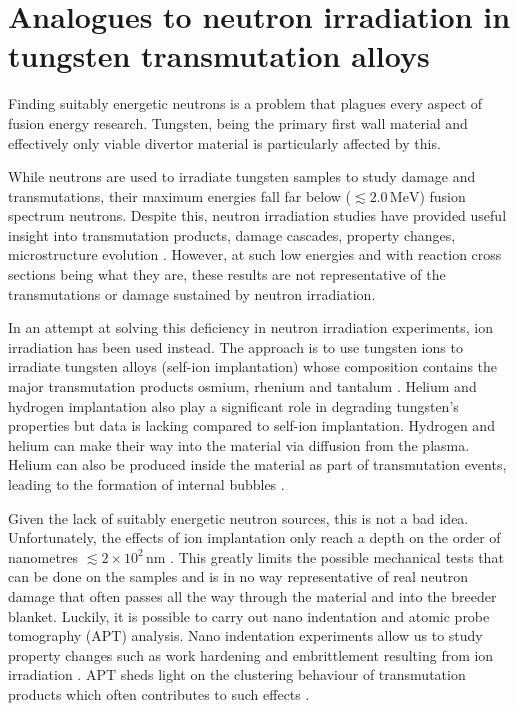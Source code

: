 \documentclass[12pt, a4paper]{article}
\begin{document}
	\section{Analogues to neutron irradiation in tungsten transmutation alloys}\label{s:ni}
		Finding suitably energetic neutrons is a problem that plagues every aspect of fusion energy research. Tungsten, being the primary first wall material and effectively only viable divertor material \cite{wdivwall} is particularly affected by this. 
		
		While neutrons are used to irradiate tungsten samples to study damage and transmutations, their maximum energies fall far below ($\lesssim 2.0\,\textrm{MeV}$) fusion spectrum neutrons. Despite this, neutron irradiation studies have provided useful insight into transmutation products, damage cascades, property changes, microstructure evolution \cite{transmute, nirrhard, colcas, nirrprop, nirpropmic, nirrmic}. However, at such low energies and with reaction cross sections being what they are, these results are not representative of the transmutations or damage sustained by neutron irradiation.
		
		In an attempt at solving this deficiency in neutron irradiation experiments, ion irradiation has been used instead. The approach is to use tungsten ions to irradiate tungsten alloys (self-ion implantation) whose composition contains the major transmutation products osmium, rhenium and tantalum \cite{ionirrmic, ionirrprop, ionirrprop2, hardening}. Helium and hydrogen implantation also play a significant role in degrading tungsten's properties \cite{helium} but data is lacking compared to self-ion implantation. Hydrogen and helium can make their way into the material via diffusion from the plasma. Helium can also be produced inside the material as part of transmutation events, leading to the formation of internal bubbles \cite{transmute, transmute2}.
		
		Given the lack of suitably energetic neutron sources, this is not a bad idea. Unfortunately, the effects of ion implantation only reach a depth on the order of nanometres $\lesssim 2 \times 10^{2}\, \textrm{nm}$ \cite{ionirrprop, ionirrprop2, hardening}. This greatly limits the possible mechanical tests that can be done on the samples and is in no way representative of real neutron damage that often passes all the way through the material and into the breeder blanket. Luckily, it is possible to carry out nano indentation and atomic probe tomography (APT) analysis. Nano indentation experiments allow us to study property changes such as work hardening and embrittlement resulting from ion irradiation \cite{ionirrmic, ionirrprop, ionirrprop2, hardening}. APT sheds light on the clustering behaviour of transmutation products which often contributes to such effects \cite{ionirrprop, ionirrprop2, hardening}.
		
\end{document}
